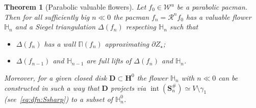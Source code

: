 \documentclass[]{amsart}
\newcommand{\bDelta}{{\mathbb{\Delta}}}
\newcommand{\bPi}{{\mathbb{\Pi}}}
\newcommand\RR{\mathcal{R}}
\newcommand\intr{\operatorname{int}}
\newcommand{\bD}{{\mathbf D}}
\newcommand{\bS}{{\mathbf S}}
\newcommand{\bH}{{\mathbf H}}
\newcommand{\fH}{{\mathbb H}}
\newcommand{\str}{{\star}}
\newcommand\WW{\mathcal{W}}
\newtheorem{thm}{Theorem}[section]
\theoremstyle{remark}
\numberwithin{equation}{section}
\theoremstyle{definition}
\begin{document}
\begin{thm}[Parabolic valuable flowers]
\label{thm:GlobParabFlower}
Let $f_0\in \WW^u$ be a parabolic pacman. Then for all sufficiently big $n\ll 0$ the pacman $f_n=\RR^{n}f_0$ has a valuable flower $\fH_n$ and a Siegel  triangulation $\bDelta(f_n)$ respecting $\fH_n$ such that
\begin{itemize}
\item  $\bDelta(f_n)$ has a wall $\bPi(f_n)$ approximating $\partial Z_\str$;
\item $\bDelta(f_{n-1})$ and $\fH_{n-1}$ are full lifts of $\bDelta(f_n)$ and $\fH_{n}$.
\end{itemize}

Moreover, for a given closed disk $\bD\subset \bH^0$ the flower $\fH_n$ with $n\ll0$  can be constructed in such a way that $\bD$ projects via $\intr\left(\bS^{\#}_{n}\right)\simeq V\setminus \gamma_1$ (see~\eqref{eq:dfn:Ssharp}) to a subset of $\fH_n^0$.
\end{thm}
\end{document}
